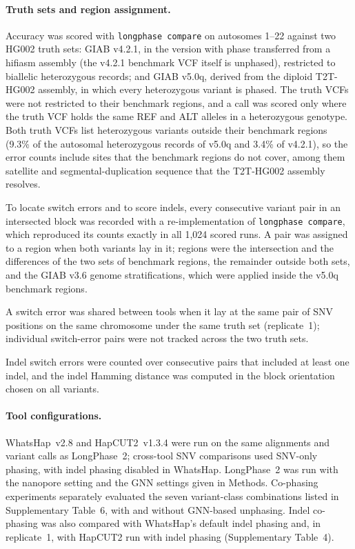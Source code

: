 \documentclass[11pt,a4paper]{article}
\newcommand{\toolname}{LongPhase~2\xspace}
\newcommand{\whatshap}{WhatsHap\xspace}
\newcommand{\hapcut}{HapCUT2\xspace}
\begin{document}
\paragraph{Truth sets and region assignment.} Accuracy was scored with \texttt{longphase compare} on autosomes 1--22 against two HG002 truth sets: GIAB v4.2.1\cite{wagner2022giab}, in the version with phase transferred from a hifiasm assembly (the v4.2.1 benchmark VCF itself is unphased), restricted to biallelic heterozygous records; and GIAB v5.0q\cite{olson2026giabv5}, derived from the diploid T2T-HG002 assembly\cite{hansen2026q100}, in which every heterozygous variant is phased.  The truth VCFs were not restricted to their benchmark regions, and a call was scored only where the truth VCF holds the same REF and ALT alleles in a heterozygous genotype.  Both truth VCFs list heterozygous variants outside their benchmark regions (9.3\% of the autosomal heterozygous records of v5.0q and 3.4\% of v4.2.1), so the error counts include sites that the benchmark regions do not cover, among them satellite and segmental-duplication sequence that the T2T-HG002 assembly resolves\cite{hansen2026q100}.

To locate switch errors and to score indels, every consecutive variant pair in an intersected block was recorded with a re-implementation of \texttt{longphase compare}, which reproduced its counts exactly in all 1,024 scored runs.  A pair was assigned to a region when both variants lay in it; regions were the intersection and the differences of the two sets of benchmark regions, the remainder outside both sets, and the GIAB v3.6 genome stratifications\cite{dwarshuis2024stratifications}, which were applied inside the v5.0q benchmark regions.

A switch error was shared between tools when it lay at the same pair of SNV positions on the same chromosome under the same truth set (replicate~1); individual switch-error pairs were not tracked across the two truth sets.

Indel switch errors were counted over consecutive pairs that included at least one indel, and the indel Hamming distance was computed in the block orientation chosen on all variants.

\paragraph{Tool configurations.} \whatshap~v2.8\cite{patterson2015whatshap} and \hapcut~v1.3.4\cite{edge2017hapcut2} were run on the same alignments and variant calls as \toolname; cross-tool SNV comparisons used SNV-only phasing, with indel phasing disabled in \whatshap.  \toolname was run with the nanopore setting and the GNN settings given in Methods.  Co-phasing experiments separately evaluated the seven variant-class combinations listed in Supplementary Table~6, with and without GNN-based unphasing.  Indel co-phasing was also compared with \whatshap's default indel phasing and, in replicate~1, with \hapcut run with indel phasing (Supplementary Table~4).
\end{document}
